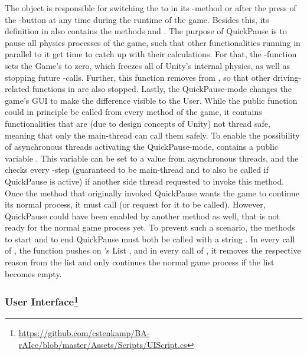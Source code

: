 The object  is responsible for switching the  to  in its -method or after the press of the -button at any time during the runtime of the game. Besides this, its definition in  also contains the methods  and . The purpose of QuickPause is to pause all physics processes of the game, such that other functionalities running in parallel to it get time to catch up with their calculations. For that, the -function sets the Game's  to zero, which freezes all of Unity's internal physics, as well as stopping future -calls. Further, this function removes  from , so that other driving-related functions in  are also stopped. Lastly, the QuickPause-mode changes the game's GUI to make the difference visible to the User. While the public function  could in principle be called from every method of the game, it contains functionalities that are (due to design concepts of Unity) not thread safe, meaning that only the main-thread can call them safely. To enable the possibility of asynchronous threads activating the QuickPause-mode,  contains a public variable . This variable can be set to a value from asynchronous threads, and the  checks every -step (guaranteed to be main-thread and to also be called if QuickPause is active) if another side thread requested to invoke this method.
Once the method that originally invoked QuickPause wants the game to continue its normal process, it must call  (or request for it to be called). However, QuickPause could have been enabled by another method as well, that is not ready for the normal game process yet. To prevent such a scenario, the methods to start and to end QuickPause must both be called with a string . In every call of , the function pushes  on 's List , and in every call of , it removes the respective reason from the list and only continues the normal game process if the list becomes empty.

\subsubsection{User Interface\footnote{\url{https://github.com/cstenkamp/BA-rAIce/blob/master/Assets/Scripts/UIScript.cs}}}

